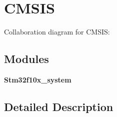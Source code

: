\section{C\+M\+S\+IS}
\label{group___c_m_s_i_s}
Collaboration diagram for C\+M\+S\+IS\+:
\subsection*{Modules}
\begin{DoxyCompactItemize}
\item 
\textbf{ Stm32f10x\+\_\+system}
\end{DoxyCompactItemize}


\subsection{Detailed Description}
